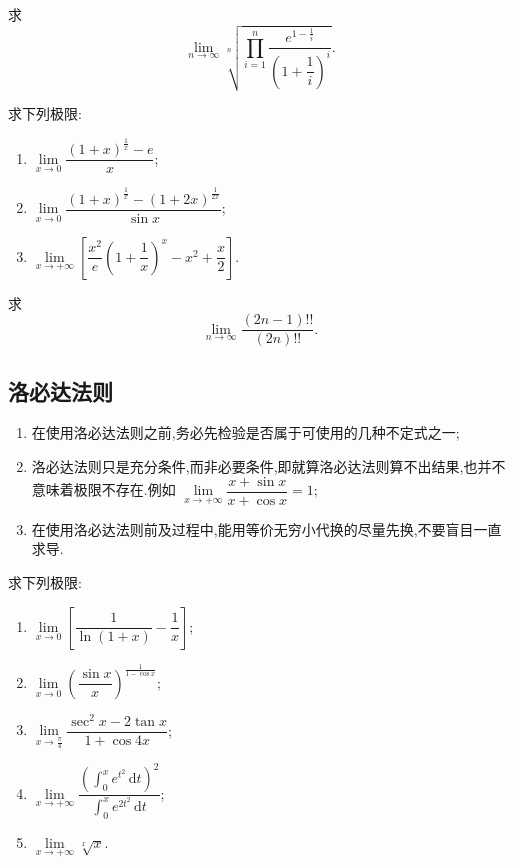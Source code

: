 \documentclass[../数学分析培优讲义.tex]{subfiles}
\begin{document}
\begin{example}
求
\[
    \lim\limits_{n\to\infty}
    \sqrt[n]{
        \prod\limits_{i=1}^{n}
        \dfrac{e^{1-\frac{1}{i}}}{\left(1+\dfrac{1}{i}\right)^i}
    }.
\]
\end{example}
\exampleblank

\begin{example}
求下列极限:
\begin{enumerate}[label=(\arabic*)]
    \item $\displaystyle
    \lim\limits_{x\to0}
    \dfrac{(1+x)^{\frac{1}{x}}-e}{x}$;
    \item $\displaystyle
    \lim\limits_{x\to0}
    \dfrac{(1+x)^{\frac{1}{x}}-(1+2x)^{\frac{1}{2x}}}{\sin x}$;
    \item $\displaystyle
    \lim\limits_{x\to+\infty}
    \left[
        \dfrac{x^2}{e}\left(1+\dfrac{1}{x}\right)^x
        -x^2+\dfrac{x}{2}
    \right]$.
\end{enumerate}
\end{example}
\exampleblank

\begin{example}
求
\[
    \lim\limits_{n\to\infty}\dfrac{(2n-1)!!}{(2n)!!}.
\]
\end{example}
\exampleblank


\newpage

\subsection{洛必达法则}

\begin{enumerate}[label=\textcircled{\arabic*},leftmargin=2.2em]
    \item 在使用洛必达法则之前,务必先检验是否属于可使用的几种不定式之一;
    \item 洛必达法则只是充分条件,而非必要条件,即就算洛必达法则算不出结果,也并不意味着极限不存在.例如
    $\displaystyle\lim\limits_{x\to+\infty}\dfrac{x+\sin x}{x+\cos x}=1$;
    \item 在使用洛必达法则前及过程中,能用等价无穷小代换的尽量先换,不要盲目一直求导.
\end{enumerate}

\begin{example}
求下列极限:
\begin{enumerate}[label=(\arabic*)]
    \item $\displaystyle
    \lim\limits_{x\to0}
    \left[\dfrac{1}{\ln(1+x)}-\dfrac{1}{x}\right]$;
    \item $\displaystyle
    \lim\limits_{x\to0}
    \left(\dfrac{\sin x}{x}\right)^{\frac{1}{1-\cos x}}$;
    \item $\displaystyle
    \lim\limits_{x\to\frac{\pi}{4}}
    \dfrac{\sec^2x-2\tan x}{1+\cos4x}$;
    \item $\displaystyle
    \lim\limits_{x\to+\infty}
    \dfrac{\left(\int_0^x e^{t^2}\,\mathrm{d}t\right)^2}
    {\int_0^x e^{2t^2}\,\mathrm{d}t}$;
    \item $\displaystyle
    \lim\limits_{x\to+\infty}\sqrt[x]{x}$.
\end{enumerate}
\end{example}
\exampleblank
\end{document}
